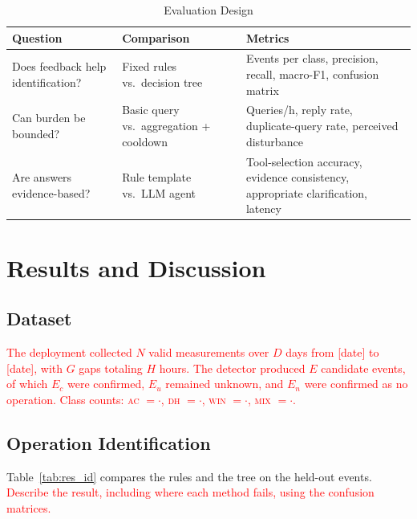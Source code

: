\documentclass[conference]{IEEEtran}
\newcommand{\todo}[1]{\textcolor{red}{#1}}
\begin{document}
\begin{table}[t]
\caption{Evaluation Design}
\label{tab:eval}
\centering
\footnotesize
\setlength{\tabcolsep}{3pt}
\begin{tabular}{@{}>{\raggedright}p{1.9cm}>{\raggedright}p{2.35cm}>{\raggedright\arraybackslash}p{3.6cm}@{}}
\toprule
Question & Comparison & Metrics \\
\midrule
Does feedback help identification? & Fixed rules vs.\ decision tree & Events per class, precision, recall, macro-F1, confusion matrix \\
Can burden be bounded? & Basic query vs.\ aggregation + cooldown & Queries/h, reply rate, duplicate-query rate, perceived disturbance \\
Are answers evidence-based? & Rule template vs.\ LLM agent & Tool-selection accuracy, evidence consistency, appropriate clarification, latency \\
\bottomrule
\end{tabular}
\end{table}

\section{Results and Discussion}
\subsection{Dataset}
\todo{The deployment collected $N$ valid measurements over $D$ days from [date] to [date], with $G$ gaps totaling $H$ hours. The detector produced $E$ candidate events, of which $E_c$ were confirmed, $E_u$ remained unknown, and $E_n$ were confirmed as no operation. Class counts: \textsc{ac} $=\cdot$, \textsc{dh} $=\cdot$, \textsc{win} $=\cdot$, \textsc{mix} $=\cdot$.}

\subsection{Operation Identification}
Table~\ref{tab:res_id} compares the rules and the tree on the held-out events. \todo{Describe the result, including where each method fails, using the confusion matrices.}
\end{document}
